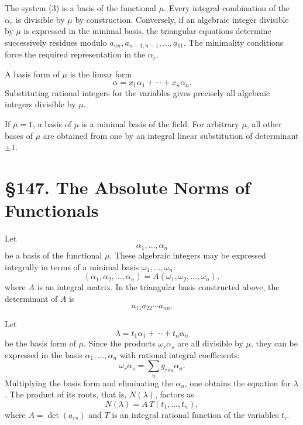 \documentclass[11pt,a4paper]{book}
\newcommand{\webersection}[2]{\clearpage\section*{\S #1. #2}}
\begin{document}
The system (3) is a basis of the functional \(\mu\).  Every integral combination of the \(\alpha_r\) is divisible by \(\mu\) by construction.  Conversely, if an algebraic integer divisible by \(\mu\) is expressed in the minimal basis, the triangular equations determine successively residues modulo \(a_{nn},a_{n-1,n-1},
\ldots,a_{11}\).  The minimality conditions force the required representation in the \(\alpha_r\).

A basis form of \(\mu\) is the linear form
\begin{equation}
 \alpha=x_1\alpha_1+
\cdots+x_n\alpha_n. \tag{4}
\end{equation}
Substituting rational integers for the variables gives precisely all algebraic integers divisible by \(\mu\).

If \(\mu=1\), a basis of \(\mu\) is a minimal basis of the field.  For arbitrary \(\mu\), all other bases of \(\mu\) are obtained from one by an integral linear substitution of determinant \(\pm1\).

\webersection{147}{The Absolute Norms of Functionals}

Let
\[
 \alpha_1,
\ldots,
\alpha_n
\]
be a basis of the functional \(\mu\).  These algebraic integers may be expressed integrally in terms of a minimal basis \(\omega_1,
\ldots,
\omega_n\):
\begin{equation}
 (\alpha_1,
\alpha_2,
\ldots,
\alpha_n)=A(\omega_1,
\omega_2,
\ldots,
\omega_n), \tag{1}
\end{equation}
where \(A\) is an integral matrix.  In the triangular basis constructed above, the determinant of \(A\) is
\[
 a_{11}a_{22}\cdots a_{nn}.
\]

Let
\begin{equation}
 \lambda=t_1\alpha_1+
\cdots+t_n\alpha_n \tag{2}
\end{equation}
be the basis form of \(\mu\).  Since the products \(\omega_r\alpha_s\) are all divisible by \(\mu\), they can be expressed in the basis \(\alpha_1,
\ldots,
\alpha_n\) with rational integral coefficients:
\begin{equation}
 \omega_r\alpha_s=\sum_u g_{rsu}\alpha_u. \tag{3}
\end{equation}
Multiplying the basis form and eliminating the \(\alpha_u\), one obtains the equation for \(\lambda\).  The product of its roots, that is, \(N(\lambda)\), factors as
\begin{equation}
 N(\lambda)=A\,T(t_1,
\ldots,t_n), \tag{4}
\end{equation}
where \(A=\det(a_{rs})\) and \(T\) is an integral rational function of the variables \(t_i\).
\end{document}
